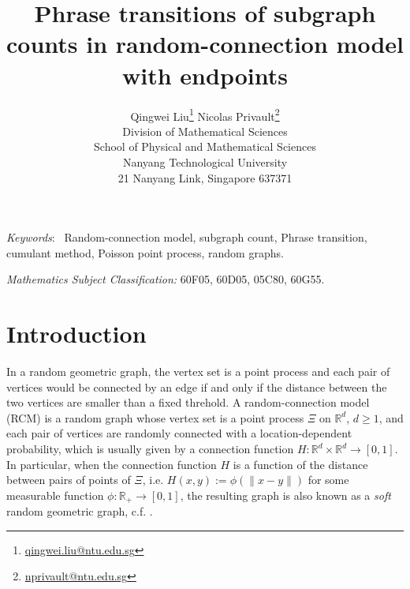 \documentclass[12pt]{article}
\newcommand{\R}{\mathbb{R}}
\numberwithin{equation}{section}
\begin{document}
\title{
\huge
 Phrase transitions of subgraph counts in random-connection model with endpoints
} 

\author{
  Qingwei Liu\footnote{\href{mailto:qingwei.liu@ntu.edu.sg}{qingwei.liu@ntu.edu.sg}}
  \qquad
      Nicolas Privault\footnote{
\href{mailto:nprivault@ntu.edu.sg}{nprivault@ntu.edu.sg}
}
  \\
\small
Division of Mathematical Sciences
\\
\small
School of Physical and Mathematical Sciences
\\
\small
Nanyang Technological University
\\
\small
21 Nanyang Link, Singapore 637371
}

\maketitle

\vspace{-0.5cm}

\begin{abstract} 

\end{abstract}
\noindent\emph{Keywords}:~
Random-connection model, 
subgraph count,
Phrase transition,
cumulant method,
Poisson point process,
random graphs.

\noindent 
{\em Mathematics Subject Classification:} 
60F05, %
60D05, %
05C80, %
60G55. %
 
\baselineskip0.7cm

\section{Introduction}
In a random geometric graph, the vertex set is a point process and each pair of vertices would be connected by an edge if and only if the distance between the two vertices are smaller than a fixed threhold. 
A random-connection model (RCM) is a random graph whose vertex set is a point process $\Xi$ on $\R^d$, $d\ge1$, and each pair of vertices are randomly connected with a location-dependent probability, which is usually given by a connection function $H:\R^d\times \R^d\to[0,1]$. In particular, when the connection function $H$ is a function of the distance between pairs of points of $\Xi$, i.e. $H(x,y):=\phi(\|x-y\|)$ for some measurable function $\phi:\R_+\to[0,1]$, the resulting graph is also known as a {\it soft} random geometric graph, c.f. \cite{penrose16,LNS21}. 
\end{document}
